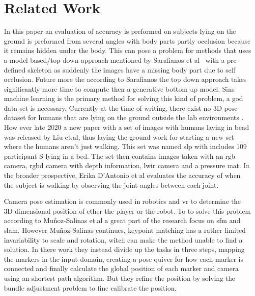 \section{Related Work}
\label{sec:related_work}
In this paper an evaluation of accuracy is preformed on subjects lying on the ground is preformed from several angles with body parts partly occlusion because it remains hidden under the body.
This can pose a problem for methods that uses a model based/top down approach mentioned by Sarafianos et al~\cite{sarafianos2016} with a pre defined skeleton as suddenly the images have a missing body part due to self occlusion.
Future more the according to Sarafianos the top down approach takes significantly more time to compute then a generative bottom up model.
Sins machine learning is the primary method for solving this kind of problem, a god data set is necessary.
Currently at the time of writing, there exist no 3D pose dataset for humans that are lying on the ground outside the lab environments \cite{yang2018, mehta2017, yasin2016, wang2019}.
How ever late 2020 a new paper with a set of images with humans laying in bead was released by Liu et.al\cite{liu2020simultaneously}, thus laying the ground work for starting a new set where the humans aren't just walking.
This set was named \ac{slp} with includes 109 participant S lying in a bed.
The set then contains images taken with an \ac{rgb} camera, \ac{rgbd} camera with depth information, \ac{lwir} camera and a pressure mat.
In the broader prospective, Erika D’Antonio et al\cite{d2021validation} evaluates the accuracy of \openpose{ } when the subject is walking by observing the joint angles between each joint.

Camera pose estimation is commonly used in robotics and \ac{vr} to determine the 3D dimensional position of ether the player or the robot.
To to solve this problem according to Mu{\~n}oz-Salinas et.al\cite{munoz2018mapping} a great part of the research focus on \ac{sfm} and \ac{slam}.
However Mu{\~n}oz-Salinas continues, keypoint matching has a rather limited invariability to scale and rotation, witch can make the method unable to find a solution.
In there work they instead divide up the tasks in three steps, mapping the markers in the input domain, creating a pose quiver for how each marker is connected and finally calculate the global position of each marker and camera using an shortest path algorithm.
But they refine the position by solving the bundle adjustment problem to fine calibrate the position.


